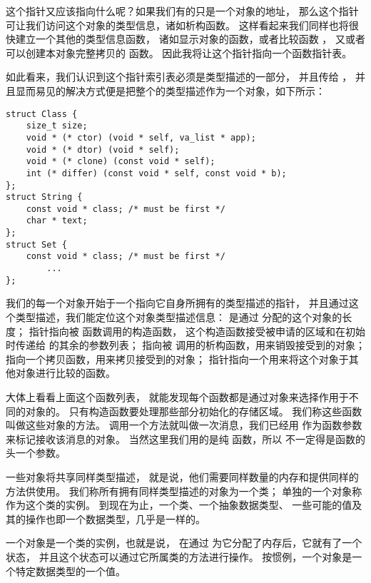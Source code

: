 这个指针又应该指向什么呢？如果我们有的只是一个对象的地址，
那么这个指针可让我们访问这个对象的类型信息，诸如析构函数。
这样看起来我们同样也将很快建立一个其他的类型信息函数，
诸如显示对象的函数，或者比较函数 ，
又或者可以创建本对象完整拷贝的  函数。
因此我将让这个指针指向一个函数指针表。

如此看来，我们认识到这个指针索引表必须是类型描述的一部分，
并且传给 ，
并且显而易见的解决方式便是把整个的类型描述作为一个对象，如下所示：
\begin{lstlisting}
struct Class {
    size_t size;
    void * (* ctor) (void * self, va_list * app);
    void * (* dtor) (void * self);
    void * (* clone) (const void * self);
    int (* differ) (const void * self, const void * b);
};
struct String {
    const void * class; /* must be first */
    char * text;
};
struct Set {
    const void * class; /* must be first */
        ...
};
\end{lstlisting}

我们的每一个对象开始于一个指向它自身所拥有的类型描述的指针，
并且通过这个类型描述，我们能定位这个对象类型描述信息：
 是通过  分配的这个对象的长度；
 指针指向被  函数调用的构造函数，
这个构造函数接受被申请的区域和在初始时传递给  的其余的参数列表；
 指向被  调用的析构函数，用来销毁接受到的对象；
 指向一个拷贝函数，用来拷贝接受到的对象；
 指针指向一个用来将这个对象于其他对象进行比较的函数。

大体上看看上面这个函数列表，
就能发现每个函数都是通过对象来选择作用于不同的对象的。
只有构造函数要处理那些部分初始化的存储区域。
我们称这些函数叫做这些对象的方法。
调用一个方法就叫做一次消息，我们已经用 
作为函数参数来标记接收该消息的对象。
当然这里我们用的是纯  函数，所以 
不一定得是函数的头一个参数。

一些对象将共享同样类型描述，
就是说，他们需要同样数量的内存和提供同样的方法供使用。
我们称所有拥有同样类型描述的对象为一个类；
单独的一个对象称作为这个类的实例。
到现在为止，一个类、一个抽象数据类型、
一些可能的值及其的操作也即一个数据类型，几乎是一样的。

一个对象是一个类的实例，也就是说，
在通过  为它分配了内存后，它就有了一个状态，
并且这个状态可以通过它所属类的方法进行操作。
按惯例，一个对象是一个特定数据类型的一个值。


